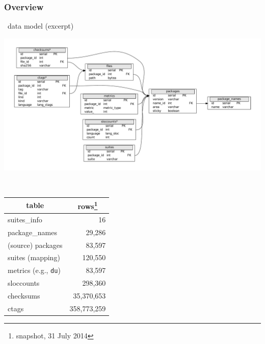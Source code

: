 \documentclass{beamer}
\begin{document}
\begin{frame}
  \frametitle{Overview}
  ~\hfill {\small data model (excerpt)}
  \vspace{-0.5cm}
  \begin{center}
    \includegraphics[width=\textwidth]{img/dbschema-simpl2}
  \end{center}
  \vspace{-2.8cm}
  \begin{center}
    \footnotesize
    ~\hspace{6.5cm}
    \begin{tabular}{@{}l|r@{}}
      \multicolumn{1}{c|}{\textbf{table}}
      & \multicolumn{1}{c}{\textbf{rows}\footnote{snapshot, 31
          July 2014}} \\
      \hline
      suites\_info   &          16 \\
      \hline
      package\_names &      29,286 \\
      (source) packages &   83,597 \\
      suites (mapping) &   120,550 \\
      \hline
      metrics (e.g., \texttt{du})
      &      83,597 \\
      sloccounts    &     298,360 \\
      checksums     &  35,370,653 \\
      ctags         & 358,773,259 \\
    \end{tabular}
  \end{center}
\end{frame}
\end{document}
